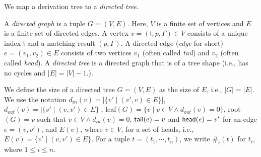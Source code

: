 \documentclass[conference]{IEEEtran}
\newcommand{\leaf}{{\sf leaf}}
\newcommand{\groot}{{\sf root}}
\newcommand{\indig}{d_{in}}
\newcommand{\outdig}{d_{out}}
\newcommand{\tail}{{\sf tail}}
\newcommand{\head}{{\sf head}}
\newcommand{\freshi}{\mathfrak{i}}
\begin{document}
We map a derivation tree to a {\em directed tree}.
\begin{definition}
\normalfont
A {\em directed graph} is a tuple $G = (V,E)$.
Here, $V$ is a finite set of vertices and $E$ is a finite set of directed edges.
A vertex $v = (\freshi{}, p, \Gamma) \in V$ consists of a unique index $\freshi{}$ and a matching result $(p, \Gamma)$.
A directed edge ({\em edge} for short) $e = (v_1, v_2) \in E$ consists of two vertices $v_1$ (often called {\em tail}) and $v_2$ (often called {\em head}).  A {\em directed tree} is a directed graph that is of a tree shape (i.e., has no cycles and $|E| = |V|-1$.).

\end{definition}
We define the size of a directed tree $G = (V,E)$ as the size of $E$, i.e., $|G| = |E|$.
We use the notation $\indig(v) = |\{ v' \mid (v', v) \in E \}|$, $\outdig(v) = |\{ v' \mid (v, v') \in E \}|$, \leaf{}$(G) = \{ v \mid v \in V \land \outdig(v) = 0 \}$, \groot{}$(G) = v$ such that $v \in V \land \indig(v) = 0$, $\tail{}(e) = v$ and $\head{}(e) =v'$ for an edge $e=(v,v')$, and $E(v)$, where $v \in V$, for a set of heads, i.e., $E(v) = \{ v' \mid (v,v') \in E \}$.
For a tuple $t = (t_1,\cdots,t_n)$, we write $\#_i(t)$ for $t_i$, where $1 \leq i \leq n$.
\end{document}
